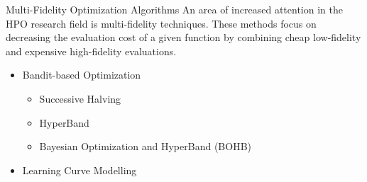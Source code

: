 \documentclass[10pt]{beamer}
\begin{document}
  \begin{frame}{Multi-Fidelity Optimization Algorithms}
    An area of increased attention in the HPO research field is multi-fidelity techniques. These methods focus on decreasing the evaluation cost of a given function by combining cheap low-fidelity and expensive high-fidelity evaluations.
    \begin{itemize}
      \item{Bandit-based Optimization}
        \begin{itemize}
          \item{Successive Halving}
          \item{HyperBand}
          \item{Bayesian Optimization and HyperBand (BOHB)}
        \end{itemize}
      \item{Learning Curve Modelling}
    \end{itemize}
  \end{frame}
\end{document}
